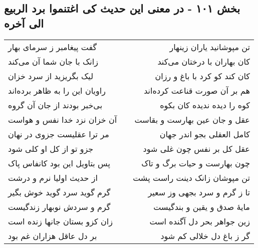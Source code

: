 \begin{center}
\section*{بخش ۱۰۱ - در معنی این حدیث کی اغتنموا برد الربیع الی آخره}
\label{sec:sh101}
\begin{longtable}{l p{0.5cm} r}
گفت پیغامبر ز سرمای بهار
&&
تن مپوشانید یاران زینهار
\\
زانک با جان شما آن می‌کند
&&
کان بهاران با درختان می‌کند
\\
لیک بگریزید از سرد خزان
&&
کان کند کو کرد با باغ و رزان
\\
راویان این را به ظاهر برده‌اند
&&
هم بر آن صورت قناعت کرده‌اند
\\
بی‌خبر بودند از جان آن گروه
&&
کوه را دیده ندیده کان بکوه
\\
آن خزان نزد خدا نفس و هواست
&&
عقل و جان عین بهارست و بقاست
\\
مر ترا عقلیست جزوی در نهان
&&
کامل العقلی بجو اندر جهان
\\
جزو تو از کل او کلی شود
&&
عقل کل بر نفس چون غلی شود
\\
پس بتاویل این بود کانفاس پاک
&&
چون بهارست و حیات برگ و تاک
\\
از حدیث اولیا نرم و درشت
&&
تن مپوشان زانک دینت راست پشت
\\
گرم گوید سرد گوید خوش بگیر
&&
تا ز گرم و سرد بجهی وز سعیر
\\
گرم و سردش نوبهار زندگیست
&&
مایهٔ صدق و یقین و بندگیست
\\
زان کزو بستان جانها زنده است
&&
زین جواهر بحر دل آگنده است
\\
بر دل عاقل هزاران غم بود
&&
گر ز باغ دل خلالی کم شود
\\
\end{longtable}
\end{center}
